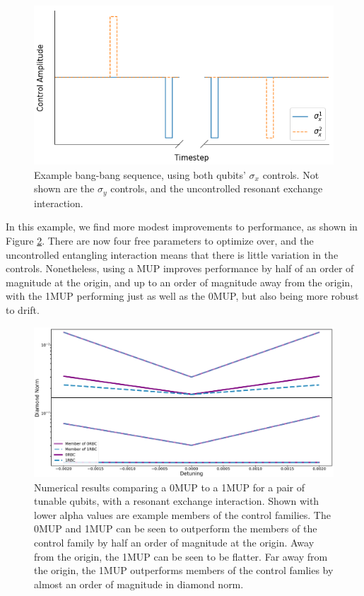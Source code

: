 \documentclass[aps,nofootinbib,pra,notitlepage,twocolumn]{revtex4-1}
\begin{document}
\begin{figure}
  \centering
  \includegraphics[width=\columnwidth]{bangbang.png}
  \caption{Example bang-bang sequence, using both qubits' $\sigma_x$ controls. Not shown are the $\sigma_y$ controls, and the uncontrolled resonant exchange interaction.}
  \label{fig:bangbang}
\end{figure}


In this example, we find more modest improvements to performance, as shown in Figure \ref{fig:2MUP}. There are now four free parameters to optimize over, and the uncontrolled entangling interaction means that there is little variation in the controls. Nonetheless, using a MUP improves performance by half of an order of magnitude at the origin, and up to an order of magnitude away from the origin, with the 1MUP performing just as well as the 0MUP, but also being more robust to drift. 


\begin{figure}
  \centering
  \includegraphics[width=\textwidth]{2QRBC.png}
  \caption{Numerical results comparing a 0MUP to a 1MUP for a pair of tunable qubits, with a resonant exchange interaction. Shown with lower alpha values are example members of the control families. The 0MUP and 1MUP can be seen to outperform the members of the control family by half an order of magnitude at the origin. Away from the origin, the 1MUP can be seen to be flatter. Far away from the origin, the 1MUP outperforms members of the control famlies by almost an order of magnitude in diamond norm.}
  \label{fig:2MUP}
\end{figure}
\end{document}
